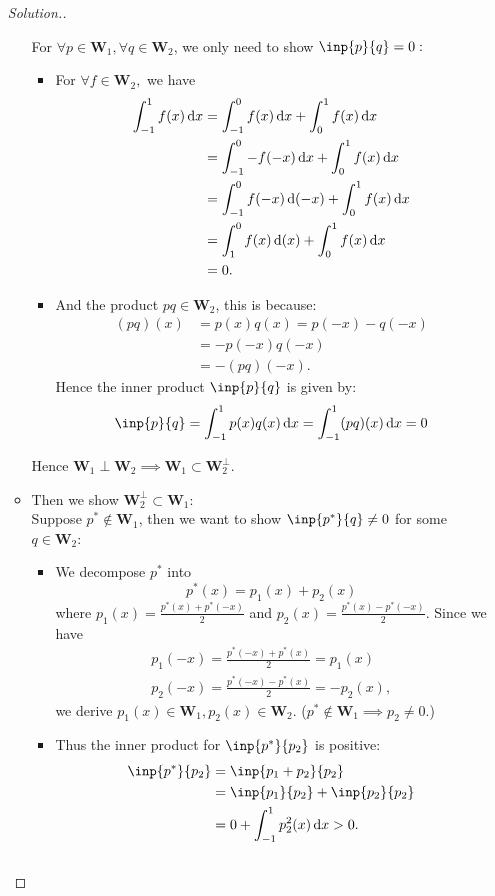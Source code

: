 \begin{enumerate}
\begin{proof}[Solution.]
\begin{itemize}
For $\forall p\in\bm W_1,\forall q\in\bm W_2$, we only need to show $\inp{p}{q}=0:$\\
\begin{itemize}
\item
For $\forall f\in\bm W_2,$ we have
\begin{align*}
\int_{-1}^{1}f(x)\,\mathrm{d} x&=\int_{-1}^{0}f(x)\,\mathrm{d} x+\int_{0}^{1}f(x)\,\mathrm{d} x\\
&=\int_{-1}^{0}-f(-x)\,\mathrm{d} x+\int_{0}^{1}f(x)\,\mathrm{d} x\\
&=\int_{-1}^{0}f(-x)\,\mathrm{d} (-x)+\int_{0}^{1}f(x)\,\mathrm{d} x\\
&=\int_{1}^{0}f(x)\,\mathrm{d} (x)+\int_{0}^{1}f(x)\,\mathrm{d} x\\
&=0.
\end{align*}
\item
And the product $pq\in\bm W_2$, this is because:
\begin{align*}
(pq)(x)&=p(x)q(x)=p(-x)-q(-x)\\
&=-p(-x)q(-x)\\
&=-(pq)(-x).
\end{align*}
Hence the inner product $\inp{p}{q}$ is given by:
\[\inp{p}{q}=\int_{-1}^{1}p(x)q(x)\diff x=\int_{-1}^{1}(pq)(x)\diff x=0
\]
\end{itemize}
Hence $\bm W_1\perp\bm W_2\implies$$\bm W_1\subset\bm W_2^{\perp}$.
\item
Then we show $\bm W_2^{\perp}\subset\bm W_1$:\\
Suppose $p^{*}\notin\bm W_1$, then we want to show $\inp{p^*}{q}\ne0$ for some $q\in\bm W_2$:\\
\begin{itemize}
\item
We decompose $p^{*}$ into
\[
p^*(x)=p_1(x)+p_2(x)
\]
where $p_1(x)=\frac{p^*(x)+p^*(-x)}{2}$ and $p_2(x)=\frac{p^*(x)-p^*(-x)}{2}$.
Since we have
\begin{gather*}
p_1(-x)=\frac{p^*(-x)+p^*(x)}{2}=p_1(x)\\
p_2(-x)=\frac{p^*(-x)-p^*(x)}{2}=-p_2(x),
\end{gather*}
we derive $p_1(x)\in\bm W_1,p_2(x)\in\bm W_2$. ($p^*\notin \bm W_1\implies p_2\ne0$.)
\item
Thus the inner product for $\inp{p^{*}}{p_2}$ is positive:
\begin{align*}
\inp{p^*}{p_2}&=\inp{p_1+p_2}{p_2}\\
&=\inp{p_1}{p_2}+\inp{p_2}{p_2}\\
&=0+\int_{-1}^{1}p_2^2(x)\diff x>0.
\end{align*}

\end{itemize}$$
\end{itemize}
\end{proof}
\end{enumerate}

